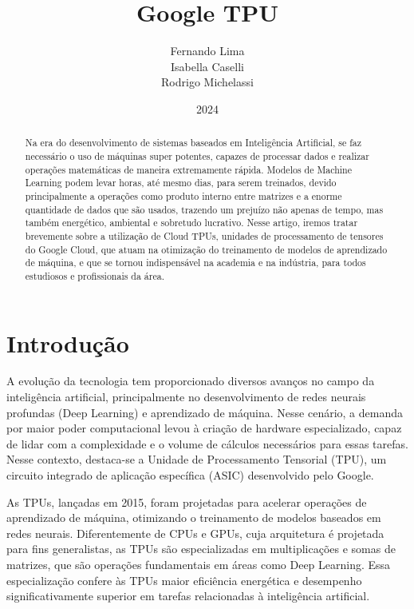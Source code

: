 \documentclass{report}
\title{Google TPU}
\author{Fernando Lima \\ Isabella Caselli \\ Rodrigo Michelassi}
\date{2024}
\begin{document}
\maketitle
\tableofcontents	%

\begin{abstract}
Na era do desenvolvimento de sistemas baseados em Inteligência Artificial, se faz necessário o uso de máquinas super potentes, capazes de processar dados e realizar operações matemáticas de maneira extremamente rápida. Modelos de Machine Learning podem levar horas, até mesmo dias, para serem treinados, devido principalmente a operações como produto interno entre matrizes e a enorme quantidade de dados que são usados, trazendo um prejuízo não apenas de tempo, mas também energético, ambiental e sobretudo lucrativo. Nesse artigo, iremos tratar brevemente sobre a utilização de Cloud TPUs, unidades de processamento de tensores do Google Cloud, que atuam na otimização do treinamento de modelos de aprendizado de máquina, e que se tornou indispensável na academia e na indústria, para todos estudiosos e profissionais da área.
\end{abstract}

\chapter{Introdução}

A evolução da tecnologia tem proporcionado diversos avanços no campo da inteligência artificial, principalmente no desenvolvimento de redes neurais profundas (Deep Learning) e aprendizado de máquina. Nesse cenário, a demanda por maior poder computacional levou à criação de hardware especializado, capaz de lidar com a complexidade e o volume de cálculos necessários para essas tarefas. Nesse contexto, destaca-se a Unidade de Processamento Tensorial (TPU), um circuito integrado de aplicação específica (ASIC) desenvolvido pelo Google.

As TPUs, lançadas em 2015, foram projetadas para acelerar operações de aprendizado de máquina, otimizando o treinamento de modelos baseados em redes neurais. Diferentemente de CPUs e GPUs, cuja arquitetura é projetada para fins generalistas, as TPUs são especializadas em multiplicações e somas de matrizes, que são operações fundamentais em áreas como Deep Learning. Essa especialização confere às TPUs maior eficiência energética e desempenho significativamente superior em tarefas relacionadas à inteligência artificial.
\end{document}
